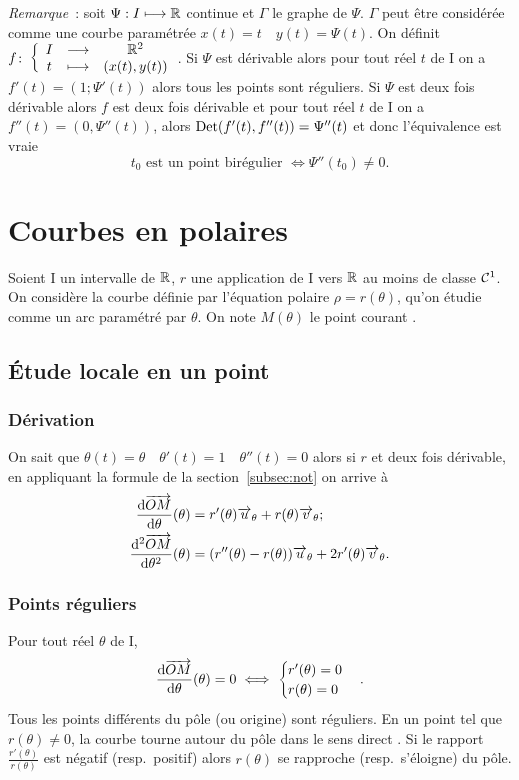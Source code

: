 \emph{Remarque}~:
soit \(\Psi : I \longmapsto \mathbb{R}\) continue et \(\Gamma\) le graphe de \(\Psi\). \(\Gamma\) peut être considérée comme une courbe paramétrée \(x(t)=t \quad y(t)=\Psi(t)\). On définit \(f\colon \left\{\begin{array}{ccc} I & \longrightarrow &\mathbb{R}^2\\ t & \longmapsto & (x(t),y(t)) \end{array} \right.\). Si \(\Psi\) est dérivable alors pour tout réel \(t\) de I on a \(f'(t)=(1;\Psi'(t))\) alors tous les points sont réguliers. Si \(\Psi\) est deux fois dérivable alors \(f\) est deux fois dérivable et pour tout réel \(t\) de I on a \(f''(t)=(0,\Psi''(t))\), alors \(\operatorname{Det}(f'(t),f''(t))=\Psi''(t)\) et donc l'équivalence est vraie
\begin{equation}
 t_0 \text{~est un point birégulier } \iff \Psi''(t_0) \neq 0.
\end{equation}

\section{Courbes en polaires}
Soient I un intervalle de \(\mathbb{R}\), \(r\) une application de I vers \(\mathbb{R}\) au moins de classe \(\mathcal{C}^{1}\). On considère la courbe définie par l'équation polaire \(\rho=r(\theta)\), qu'on étudie comme un arc paramétré par \(\theta\). On note \(M(\theta)\) le point \og courant \fg{}.

\subsection{Étude locale en un point}
\subsubsection{Dérivation}
On sait que \(\theta(t)=\theta \quad \theta'(t)=1 \quad \theta''(t)=0\) alors si \(r\) et deux fois dérivable, en appliquant la formule de la section~\ref{subsec:not} on arrive à
\begin{align}
 \dfrac{\mathrm{d} \overrightarrow{OM}}{\mathrm{d} \theta}(\theta)&=r'(\theta) \overrightarrow{u}_\theta + r(\theta) \overrightarrow{v}_\theta;\\
 \dfrac{\mathrm{d}^2 \overrightarrow{OM}}{\mathrm{d} {\theta}^2}(\theta)&=(r''(\theta)-r(\theta)) \overrightarrow{u}_\theta + 2r'(\theta) \overrightarrow{v}_\theta.
\end{align}

\subsubsection{Points réguliers}
Pour tout réel \(\theta\) de I,
\begin{equation}
 \dfrac{\mathrm{d} \overrightarrow{OM}}{\mathrm{d} \theta}(\theta)=0 \iff
 \begin{cases}
   r'(\theta) = 0 \\ r(\theta)=0
 \end{cases}.
\end{equation}
Tous les points différents du pôle (ou origine) sont réguliers. En un point tel que \(r(\theta) \neq 0\), la courbe \og tourne autour du pôle dans le sens direct \fg{}. Si le rapport \(\frac{r'(\theta)}{r(\theta)}\) est négatif (resp.\ positif) alors \(r(\theta)\) se rapproche (resp.\ s'éloigne) du pôle.

